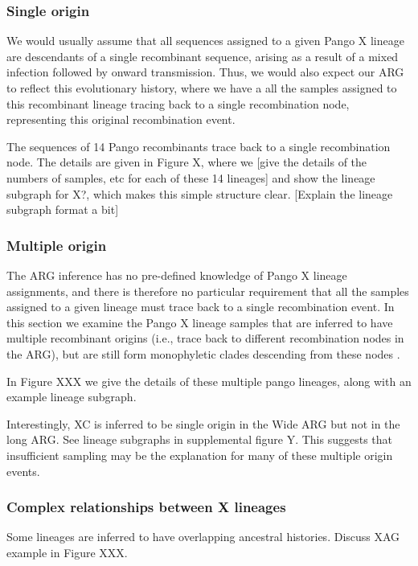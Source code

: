 \documentclass{article}
\begin{document}
\subsubsection{Single origin}

We would usually assume that all sequences assigned to a given Pango X
lineage are descendants of a single recombinant sequence, arising as a
result of a mixed infection followed by onward transmission. Thus, we
would also expect our ARG to reflect this evolutionary history, where
we have a all the samples assigned to this recombinant lineage tracing
back to a single recombination node, representing this original
recombination event.

The sequences of 14 Pango recombinants trace back to a single recombination
node. The details are given in Figure X, where we [give the details of
the numbers of samples, etc for each of these 14 lineages] and
show the lineage subgraph for X?, which makes this simple structure
clear. [Explain the lineage subgraph format a bit]

\subsubsection{Multiple origin}
The ARG inference has no pre-defined knowledge of Pango X lineage assignments,
and there is therefore no particular requirement that all the samples
assigned to a given lineage must trace back to a single recombination
event. In this section we examine the Pango X lineage samples that
are inferred to have multiple recombinant origins (i.e., trace
back to different recombination nodes in the ARG), but are still
form monophyletic clades %
descending from these nodes .

In Figure XXX we give the details of these multiple pango lineages,
along with an example lineage subgraph.

Interestingly, XC is inferred to be single origin in the Wide ARG but
not in the long ARG. See lineage subgraphs in supplemental figure Y.
This suggests that insufficient sampling may be the explanation for
many of these multiple origin events.

\subsubsection{Complex relationships between X lineages}

Some lineages are inferred to have overlapping ancestral histories.
Discuss XAG example in Figure XXX.
\end{document}
